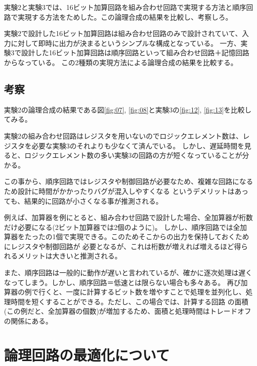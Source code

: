 \documentclass[uplatex]{jsarticle}
\begin{document}
実験2と実験3では、16ビット加算回路を組み合わせ回路で実現する方法と順序回路で実現する方法をためした。この論理合成の結果を比較し、考察しろ。

実験2で設計した16ビット加算回路は組み合わせ回路のみで設計されていて、入力に対して即時に出力が決まるというシンプルな構成となっている。
一方、実験3で設計した16ビット加算回路は順序回路といって組み合わせ回路＋記憶回路からなっている。
この2種類の実現方法による論理合成の結果を比較する。

\subsection{考察}

実験2の論理合成の結果である図\ref{fig:07}, \ref{fig:08}と実験3の\ref{fig:12}, \ref{fig:13}を比較してみる。

実験2の組み合わせ回路はレジスタを用いないのでロジックエレメント数は、レジスタを必要な実験3のそれよりも少なくて済んでいる。
しかし、遅延時間を見ると、ロジックエレメント数の多い実験3の回路の方が短くなっていることが分かる。

この事から、順序回路ではレジスタや制御回路が必要なため、複雑な回路になるため設計に時間がかかったりバグが混入しやすくなる
というデメリットはあっても、結果的に回路が小さくなる事が推測される。

例えば、加算器を例にとると、組み合わせ回路で設計した場合、全加算器が桁数だけ必要になる(2ビット加算器では2個のように)。
しかし、順序回路では全加算器をたったの1個で実現できる。このためそこからの出力を保持しておくためにレジスタや制御回路が
必要となるが、これは桁数が増えれば増えるほど得られるメリットは大きいと推測される。

また、順序回路は一般的に動作が遅いと言われているが、確かに逐次処理は遅くなってしまう。しかし、順序回路＝低速とは限らない場合も多々ある。
再び加算器の例で行くと、一度に計算するビット数を増やすことで処理を並列化し、処理時間を短くすることができる。ただし、この場合では、計算する回路
の面積(この例だと、全加算器の個数)が増加するため、面積と処理時間はトレードオフの関係にある。

\clearpage

\section{論理回路の最適化について}
\end{document}
